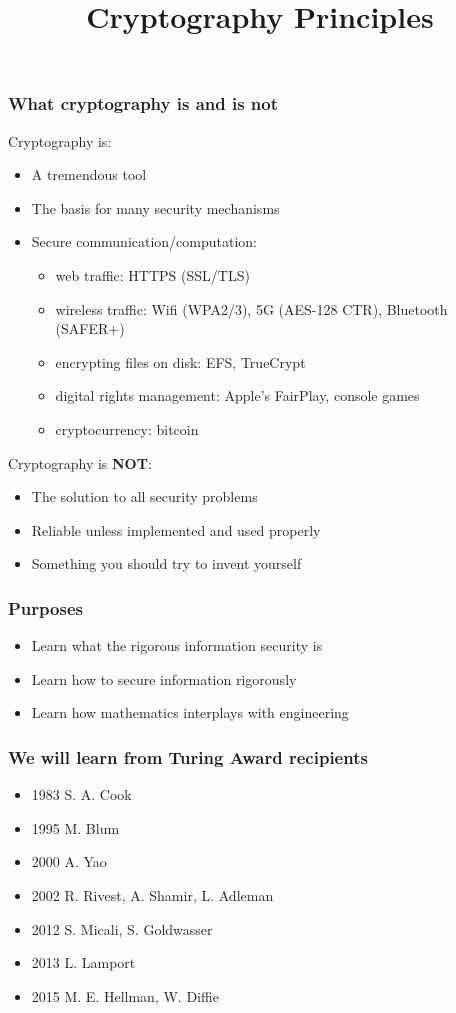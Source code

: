 

\title{Cryptography Principles}


\maketitle
\begin{frame}\frametitle{What cryptography is and is not}
Cryptography is:
\begin{itemize}
\item A tremendous tool
\item The basis for many security mechanisms
\item Secure communication/computation: 
\begin{itemize}
\item web traffic: HTTPS (SSL/TLS)
\item wireless traffic: Wifi (WPA2/3), 5G (AES-128 CTR), Bluetooth (SAFER+)
\item encrypting files on disk: EFS, TrueCrypt
\item digital rights management: Apple's FairPlay, console games 
\item cryptocurrency: bitcoin
\end{itemize}
\end{itemize}
Cryptography is \textbf{NOT}:
\begin{itemize}
\item The solution to all security problems
\item Reliable unless implemented and used properly
\item Something you should try to invent yourself	
\end{itemize}
\end{frame}
\begin{frame}\frametitle{Purposes}
\begin{itemize}
\item Learn what the rigorous information security is
\item Learn how to secure information rigorously
\item Learn how mathematics interplays with engineering
\end{itemize}
\end{frame}
\begin{frame}\frametitle{We will learn from Turing Award recipients}
\begin{itemize}
\item{1983} S. A. Cook
\item{1995} M. Blum
\item{2000} A. Yao
\item{2002} R. Rivest, A. Shamir, L. Adleman
\item{2012} S. Micali, S. Goldwasser
\item{2013} L. Lamport
\item{2015} M. E. Hellman, W. Diffie
\end{itemize}	
\end{frame}
